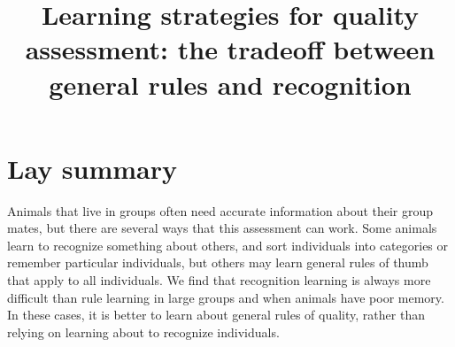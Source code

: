






\noindent
\title{Learning strategies for quality assessment: the tradeoff between general rules and recognition} 
\author{}
\date{} 
\maketitle


\linenumbers

\section*{Lay summary}
Animals that live in groups often need accurate information about their group mates, but there are several ways that this assessment can work. Some animals learn to recognize something about others, and sort individuals into categories or remember particular individuals, but others may learn general rules of thumb that apply to all individuals. We find that recognition learning is always more difficult than rule learning in large groups and when animals have poor memory. In these cases, it is better to learn about general rules of quality, rather than relying on learning about to recognize individuals.



